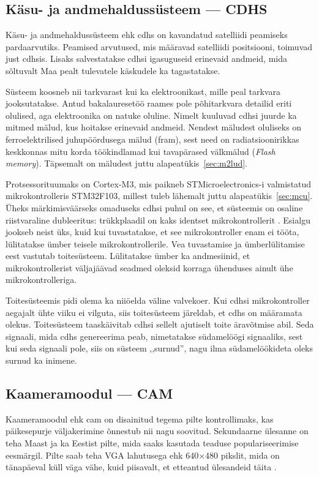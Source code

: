 \documentclass[12pt,a4paper]{article}
\begin{document}
\subsection{Käsu- ja andmehaldussüsteem --- CDHS}
Käsu- ja andmehaldussüsteem ehk \gls{cdhs} on kavandatud satelliidi peamiseks
pardaarvutiks. Peamised arvutused, mis määravad satelliidi positsiooni, toimuvad
just \gls{cdhs}is. Lisaks salvestatakse \gls{cdhs}i igasuguseid erinevaid
andmeid, mida sõltuvalt Maa pealt tulevatele käskudele ka tagastatakse.

Süsteem koosneb nii tarkvarast kui ka elektroonikast, mille peal tarkvara
jooksutatakse. Antud bakalauresetöö raames pole põhitarkvara detailid eriti
olulised, aga elektroonika on natuke oluline. Nimelt kuuluvad \gls{cdhs}i juurde
ka mitmed mälud, kus hoitakse erinevaid andmeid. Nendest mäludest oluliseks on
ferroelektrilised juhupöördusega mälud (\gls{fram}), sest need on
radiatsioonirikkas keskkonnas mitu korda töökindlamad kui tavapärased välkmälud
(\textit{Flash memory}). Täpsemalt on mäludest juttu
alapeatükis~\ref{sec:m2lud}.

Protsessorituumaks on Cortex-M3, mis paikneb STMicroelectronics-i 
valmistatud mikrokontrolleris STM32F103, millest tuleb lähemalt juttu
alapeatükis~\ref{sec:mcu}. Üheks märkimisväärseks omaduseks \gls{cdhs}i puhul on
see, et süsteemis on osaline riistvaraline dubleeritus: trükkplaadil on kaks
identset mikrokontrollerit \cite{cdhs}. Esialgu jookseb neist üks, kuid kui
tuvastatakse, et see mikrokontroller enam ei tööta, lülitatakse ümber teisele
mikrokontrollerile. Vea tuvastamise ja ümberlülitamise eest vastutab
toitesüsteem. Lülitatakse ümber ka andmesiinid, et mikrokontrollerist
väljajäävad seadmed oleksid korraga ühenduses ainult ühe mikrokontrolleriga.

Toitesüsteemis pidi olema ka niiöelda väline valvekoer. Kui \gls{cdhs}i
mikrokontroller aegajalt ühte viiku ei vilguta, siis toitesüsteem järeldab, et
\gls{cdhs} on määramata olekus. Toitesüsteem taaskäivitab \gls{cdhs}i sellelt
ajutiselt toite äravõtmise abil. Seda signaali, mida \gls{cdhs} genereerima
peab, nimetatakse südamelöögi signaaliks, sest kui seda signaali pole, siis on
süsteem ,,surnud'', nagu ilma südamelöökideta oleks surnud ka inimene.

\subsection{Kaameramoodul --- CAM}
Kaameramoodul ehk \gls{cam} on disainitud tegema pilte kontrollimaks, kas
päikesepurje väljakerimine õnnestub nii nagu soovitud. Sekundaarne ülesanne on
teha Maast ja ka Eestist pilte, mida saaks kasutada teaduse populariseerimise
eesmärgil. Pilte saab teha VGA lahutusega ehk 640\(\times\)480 pikslit, mida on
tänapäeval küll väga vähe, kuid piisavalt, et etteantud ülesandeid täita
\cite{cam}.
\end{document}
